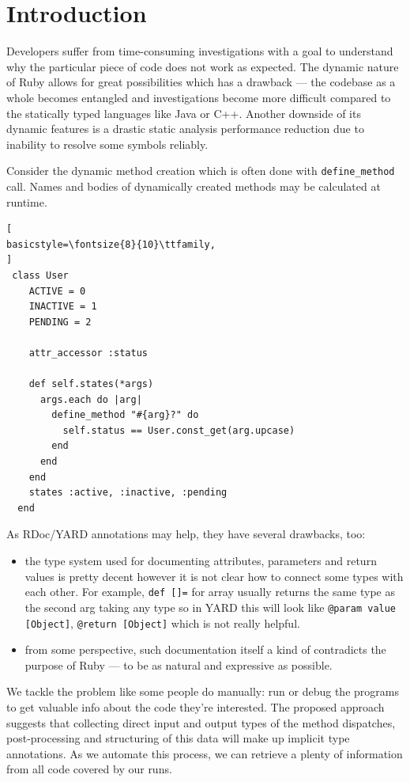 \documentclass[conference]{IEEEtran}
\begin{document}
\section{Introduction}
Developers suffer from time-consuming investigations with a goal to understand why the particular piece of code does not
work as expected. The dynamic nature of Ruby allows for great possibilities which has a drawback — the codebase as a
whole becomes entangled and investigations become more difficult compared to the statically typed languages like Java or
C++. Another downside of its dynamic features is a drastic static analysis performance reduction due to inability to
resolve some symbols reliably. 

Consider the dynamic method creation which is often done with \texttt{define\_method} call.  Names and bodies of
dynamically created methods may be calculated at runtime\cite{gradual_type}.
\begin{lstlisting}[
basicstyle=\fontsize{8}{10}\ttfamily,
]
 class User
    ACTIVE = 0
    INACTIVE = 1
    PENDING = 2

    attr_accessor :status

    def self.states(*args)
      args.each do |arg|
        define_method "#{arg}?" do
          self.status == User.const_get(arg.upcase)
        end
      end
    end
    states :active, :inactive, :pending
  end
\end{lstlisting}
As RDoc/YARD annotations may help, they have several drawbacks, too:


\begin{itemize}  
\item the type system used for documenting attributes, parameters and return values is pretty decent however it is not
  clear how to connect some types with each other. For example, \texttt{def []=} for array usually returns the same type
    as the second arg taking any type so in YARD this will look like \texttt{@param value [Object]}, \texttt{@return
    [Object]} which is not really helpful.
\item from some perspective, such documentation itself a kind of contradicts the purpose of Ruby — to be as natural and
  expressive as possible. 
\end{itemize}

We tackle the problem like some people do manually: run or debug the programs to get valuable info about the code
they're interested. The proposed approach suggests that collecting direct input and output types of the method
dispatches, post-processing and structuring of this data will make up implicit type annotations. As we automate this
process, we can retrieve a plenty of information from all code covered by our runs.
\end{document}
